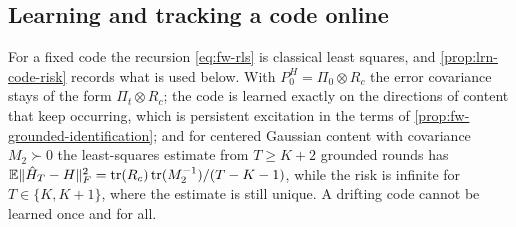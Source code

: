 \subsection{Learning and tracking a code online}\label{sec:lrn-online}

For a fixed code the recursion \cref{eq:fw-rls} is classical least squares, and \cref{prop:lrn-code-risk} records what is used below. With $P^H_0=\Pi_0\otimes R_c$ the error covariance stays of the form $\Pi_t\otimes R_c$; the code is learned exactly on the directions of content that keep occurring, which is persistent excitation in the terms of \cref{prop:fw-grounded-identification}; and for centered Gaussian content with covariance $M_2\succ0$ the least-squares estimate from $T\ge K+2$ grounded rounds has $\mathbb{E}\Vert\hat H_T-H\Vert_F^2=\operatorname{tr}(R_c)\operatorname{tr}(M_2^{-1})/(T-K-1)$, while the risk is infinite for $T\in\{K,K+1\}$, where the estimate is still unique. A drifting code cannot be learned once and for all.

